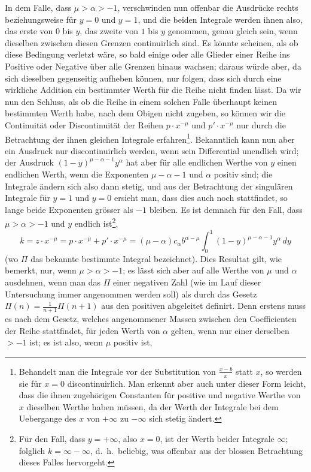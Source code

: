 \documentclass[12pt,a4paper]{article}
\begin{document}
In dem Falle, dass $\mu > \alpha > -1$, verschwinden nun offenbar die Ausdr\"ucke rechts beziehungsweise f\"ur $y=0$ und $y=1$, und die beiden Integrale werden ihnen also, das erste von $0$ bis $y$, das zweite von $1$ bis $y$ genommen, genau gleich sein, wenn dieselben zwischen diesen Grenzen continuirlich sind. Es k\"onnte scheinen, als ob diese Bedingung verletzt w\"are, so bald einige oder alle Glieder einer Reihe ins Positive oder Negative \"uber alle Grenzen hinaus wachsen; daraus w\"urde aber, da sich dieselben gegenseitig aufheben k\"onnen, nur folgen, dass sich durch eine wirkliche Addition ein bestimmter Werth f\"ur die Reihe nicht finden l\"asst. Da wir nun den Schluss, als ob die Reihe in einem solchen Falle \"uberhaupt keinen bestimmten Werth habe, nach dem Obigen nicht zugeben, so k\"onnen wir die Continuit\"at oder Discontinuit\"at der Reihen $p \cdot x^{-\mu}$ und $p' \cdot x^{-\mu}$ nur durch die Betrachtung der ihnen gleichen Integrale erfahren\footnote{Behandelt man die Integrale vor der Substitution von $\frac{x-b}{x}$ statt $x$, so werden sie f\"ur $x=0$ discontinuirlich. Man erkennt aber auch unter dieser Form leicht, dass die ihnen zugeh\"origen Constanten f\"ur positive und negative Werthe von $x$ dieselben Werthe haben m\"ussen, da der Werth der Integrale bei dem Uebergange des $x$ von $+\infty$ zu $-\infty$ sich stetig \"andert.}. Bekanntlich kann nun aber ein Ausdruck nur discontinuirlich werden, wenn sein Differential unendlich wird; der Ausdruck $(1-y)^{\mu-\alpha-1}y^{\alpha}$ hat aber f\"ur alle endlichen Werthe von $y$ einen endlichen Werth, wenn die Exponenten $\mu-\alpha-1$ und $\alpha$ positiv sind; die Integrale \"andern sich also dann stetig, und aus der Betrachtung der singul\"aren Integrale f\"ur $y=1$ und $y=0$ ersieht man, dass dies auch noch stattfindet, so lange beide Exponenten gr\"osser als $-1$ bleiben. Es ist demnach f\"ur den Fall, dass $\mu > \alpha > -1$ und $y$ endlich ist\footnote{F\"ur den Fall, dass $y = +\infty$, also $x=0$, ist der Werth beider Integrale $\infty$; folglich $k = \infty - \infty$, d.\ h.\ beliebig, was offenbar aus der blossen Betrachtung dieses Falles hervorgeht.},
\begin{equation}\label{eq:intresult}
k = z \cdot x^{-\mu} = p \cdot x^{-\mu} + p' \cdot x^{-\mu} = (\mu - \alpha) c_\alpha b^{\alpha-\mu} \int_0^1 (1-y)^{\mu-\alpha-1} y^\alpha \, dy
\end{equation}
(wo $\Pi$ das bekannte bestimmte Integral bezeichnet). Dies Resultat gilt, wie bemerkt, nur, wenn $\mu > \alpha > -1$; es l\"asst sich aber auf alle Werthe von $\mu$ und $\alpha$ ausdehnen, wenn man das $\Pi$ einer negativen Zahl (wie im Lauf dieser Untersuchung immer angenommen werden soll) als durch das Gesetz $\Pi(n) = \frac{1}{n+1}\Pi(n+1)$ aus den positiven abgeleitet definirt. Denn erstens muss es nach dem Gesetz, welches angenommener Massen zwischen den Coefficienten der Reihe stattfindet, f\"ur jeden Werth von $\alpha$ gelten, wenn nur einer derselben $>-1$ ist; es ist also, wenn $\mu$ positiv ist,
\end{document}
